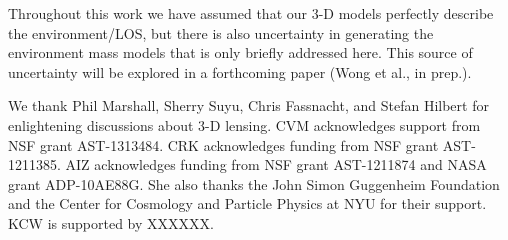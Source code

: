 \documentclass{emulateapj}
\begin{document}
Throughout this work we have assumed that our 3-D models perfectly describe the environment/LOS, but there is also uncertainty in generating the environment mass models that is only briefly addressed here. This source of uncertainty will be explored in a forthcoming paper (Wong et al., in prep.).

\acknowledgements
We thank Phil Marshall, Sherry Suyu, Chris Fassnacht, and Stefan Hilbert for enlightening discussions about 3-D lensing. CVM acknowledges support from NSF grant AST-1313484. CRK acknowledges funding from NSF grant AST-1211385. AIZ acknowledges funding from NSF grant AST-1211874 and NASA grant ADP-10AE88G. She also thanks the John Simon Guggenheim Foundation and the Center for Cosmology and Particle Physics at NYU for their support. KCW is supported by XXXXXX.




\end{document}
